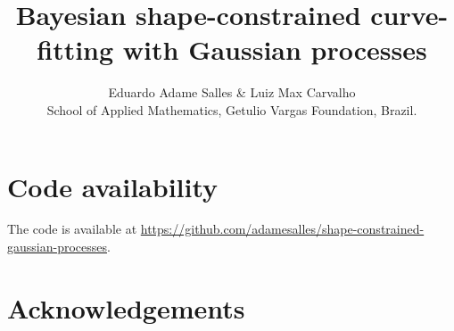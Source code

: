 \documentclass[a4paper, notitlepage, 12pt]{article}
\title{\vspace{-9ex}\centering \bf Bayesian shape-constrained curve-fitting with Gaussian processes
}
\author{
Eduardo Adame Salles  \&
Luiz Max Carvalho\\
School of Applied Mathematics, Getulio Vargas Foundation, Brazil.
}
\begin{document}
\maketitle













\section*{Code availability}
\label{sec:code}

The code is available at \url{https://github.com/adamesalles/shape-constrained-gaussian-processes}.

\section*{Acknowledgements}


\newpage



\newpage
\appendix

\setcounter{table}{0}
\renewcommand{\thetable}{S\arabic{table}}
\renewcommand{\thefigure}{S\arabic{figure}}



\end{document}
